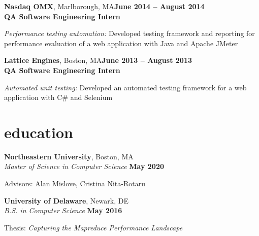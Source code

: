 \documentclass[margin,line]{resume}
\begin{document}
\begin{resume}
\textbf{Nasdaq OMX}, Marlborough, MA\hfill\textbf{June 2014 -- August 2014}\\
\textbf{QA Software Engineering Intern}\hfill 
\vspace{-3mm}\\\vspace{-1mm}
\begin{list2}
	\item \filbreak\textit{Performance testing automation:} Developed testing framework and reporting
    for performance evaluation of a web application with Java and Apache JMeter
\end{list2}

\textbf{Lattice Engines}, Boston, MA\hfill\textbf{June 2013 -- August 2013}\\
\textbf{QA Software Engineering Intern}\hfill 
\vspace{-3mm}\\\vspace{-1mm}
\begin{list2}
	\item \filbreak\textit{Automated unit testing:} Developed an automated testing framework
    for a web application with C\# and Selenium
\end{list2}

\section{\mysidestyle education}
\textbf{Northeastern University}, Boston, MA \vspace{1mm}\\%
\textsl{Master of Science in Computer Science} \hfill \textbf{May 2020}
\vspace{-3mm}\\\vspace{-1mm}%
\begin{list2}
	\item Advisors: Alan Mislove, Cristina Nita-Rotaru
\end{list2}

\textbf{University of Delaware}, Newark, DE \vspace{1mm}\\%
\textsl{B.S. in Computer Science} \hfill \textbf{May 2016}\vspace{-3mm}\\\vspace{-1mm}%
\begin{list2}
    \item Thesis: \textsl{Capturing the Mapreduce Performance Landscape}
\end{list2}\vspace{-1.5mm}


\end{resume}
\end{document}
